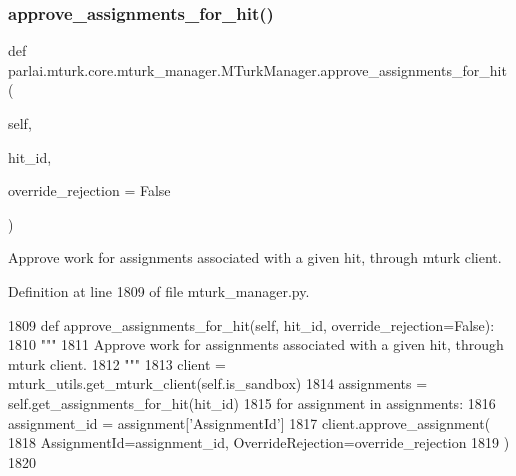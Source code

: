 \subsubsection{\texorpdfstring{approve\+\_\+assignments\+\_\+for\+\_\+hit()}{approve\_assignments\_for\_hit()}}
{\footnotesize\ttfamily def parlai.\+mturk.\+core.\+mturk\+\_\+manager.\+M\+Turk\+Manager.\+approve\+\_\+assignments\+\_\+for\+\_\+hit (\begin{DoxyParamCaption}\item[{}]{self,  }\item[{}]{hit\+\_\+id,  }\item[{}]{override\+\_\+rejection = {\ttfamily False} }\end{DoxyParamCaption})}

\begin{DoxyVerb}Approve work for assignments associated with a given hit, through mturk client.
\end{DoxyVerb}
 

Definition at line 1809 of file mturk\+\_\+manager.\+py.


\begin{DoxyCode}
1809     \textcolor{keyword}{def }approve\_assignments\_for\_hit(self, hit\_id, override\_rejection=False):
1810         \textcolor{stringliteral}{"""}
1811 \textcolor{stringliteral}{        Approve work for assignments associated with a given hit, through mturk client.}
1812 \textcolor{stringliteral}{        """}
1813         client = mturk\_utils.get\_mturk\_client(self.is\_sandbox)
1814         assignments = self.get\_assignments\_for\_hit(hit\_id)
1815         \textcolor{keywordflow}{for} assignment \textcolor{keywordflow}{in} assignments:
1816             assignment\_id = assignment[\textcolor{stringliteral}{'AssignmentId'}]
1817             client.approve\_assignment(
1818                 AssignmentId=assignment\_id, OverrideRejection=override\_rejection
1819             )
1820 
\end{DoxyCode}
\mbox{\label{classparlai_1_1mturk_1_1core_1_1mturk__manager_1_1MTurkManager_a0accb6612484648ec2666c01a3597cf8}} 

